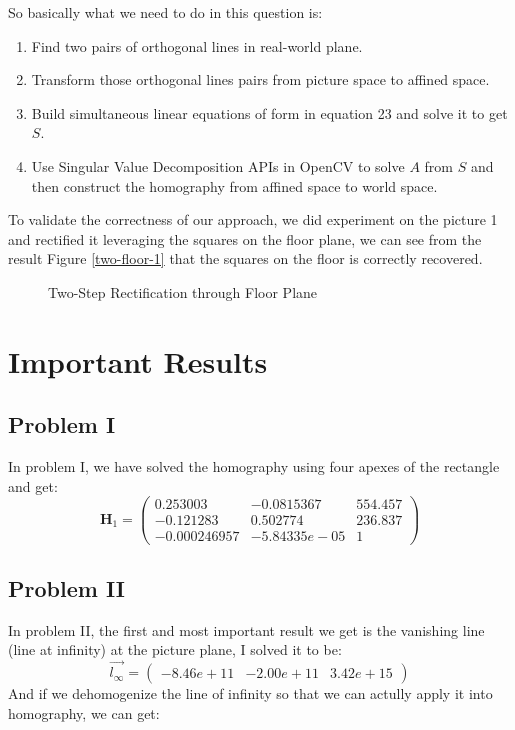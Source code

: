 \documentclass[conference]{IEEEtran}
\let\oldvec\vec
\renewcommand{\vec}[1]{\oldvec{\mathit{#1}}}
\newcommand{\mat}[1]{\mathbf{#1}} %
\begin{document}
\noindent So basically what we need to do in this question is:
\begin{enumerate}
	\item Find two pairs of orthogonal lines in real-world plane.
	\item Transform those orthogonal lines pairs from picture space to affined space.
	\item Build simultaneous linear equations of form in equation 23 and solve it to get $S$.
	\item Use Singular Value Decomposition APIs in OpenCV to solve $A$ from $S$ and then construct the homography from affined space to world space.
\end{enumerate}

To validate the correctness of our approach, we did experiment on the picture 1 and rectified it leveraging the squares on the floor plane, we can see from the result Figure \ref{two-floor-1} that the squares on the floor is correctly recovered.

\begin{figure*}[!hpbt]
  \caption{Two-Step Rectification through Floor Plane}
  \label{two-step-rectify-floor} %
\end{figure*}

\section{Important Results}
\subsection{Problem I}
In problem I, we have solved the homography using four apexes of the rectangle and get:
\begin{equation}
	\mat{H}_1=
	\begin{pmatrix}
		0.253003 & -0.0815367 & 554.457\\
-0.121283 & 0.502774 & 236.837\\
-0.000246957 & -5.84335e-05 & 1
	\end{pmatrix}
\end{equation}
\subsection{Problem II}
In problem II, the first and most important result we get is the vanishing line (line at infinity) at the picture plane, I solved it to be:
\begin{equation}
	\vec{l_\infty}=
	\begin{pmatrix}
		-8.46e+11 & -2.00e+11 & 3.42e+15
	\end{pmatrix}
\end{equation}
And if we dehomogenize the line of infinity so that we can actully apply it into homography, we can get:
\end{document}
